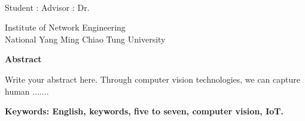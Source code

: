  \begin{center}
  	\large
  	\begin{singlespace}
  		\textbf{\englishTitle{}} \\[0.5cm]
  	\end{singlespace}
  	
  	\begin{singlespace}

  			Student : \studentEnName{}  \hspace{1.0cm} Advisor  : Dr.\, \advisorEnName \\
  			[0.5cm]

  	\end{singlespace}
  	
  	\begin{singlespace}
  		Institute of Network Engineering\\
  		National Yang Ming Chiao Tung University\\[0.5cm]
  	\end{singlespace}
  	\textbf{Abstract} \\[0.5cm]
  	
  \end{center}
  \normalsize 
  
Write your abstract here. Through computer vision technologies, we can capture human .......


\vspace{1cm}

\textbf{Keywords: English, keywords, five to seven, computer vision, IoT.} 
  
